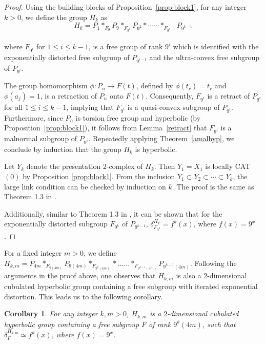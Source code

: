 \documentclass[oneside,11pt,reqno]{amsart}
\newtheorem{cor}[thm]{Corollary}
\theoremstyle{definition}
\begin{document}
\begin{proof}
Using the building blocks of Proposition~\ref{prop:block1}, for any integer $k>0$, we define the group $H_k$ as
$$H_k = P_1 \ast_{F_9} P_9 \ast_{F_{9^2}} P_{9^2} \ast \cdots \cdots \ast_{F_{9^{k-1}}} P_{9^{k-1}}$$\\
where $F_{9^i}$ for $1\leq i \leq k-1$, is a free group of rank $9^i$ which is identified with the exponentially distorted free subgroup of $P_{9^{i-1}}$ and the ultra-convex free subgroup of $P_{9^i}$.

The group homomorphism $\phi : P_n \rightarrow F(t)$, defined by $\phi(t_r)=t_r$ and $\phi(a_j)=1$, is a retraction of $P_n$ onto $F(t)$. Consequently, $F_{9^i}$ is a retract of $P_{9^i}$ for all $1 \leq i \leq k-1$,  implying that $F_{9^i}$ is a quasi-convex subgroup of $P_{9^i}$. Furthermore, since $P_n$ is torsion free group  and hyperbolic  (by Proposition~\ref{prop:block1}), it follows from Lemma~\ref{retract} that $F_{9^i}$ is a malnormal subgroup of $P_{9^i}$.  Repeatedly applying Theorem~\ref{amalhyp}, we conclude by induction that the group $H_k$ is hyperbolic.


Let $Y_k$ denote the presentation $2$-complex of $H_k$. Then $ Y_1 = X_1$ is locally CAT$(0)$  by Proposition \ref{prop:block1}.
From the inclusion $Y_1 \subset Y_2 \subset \cdots \subset Y_k$, the large link condition can be checked by induction on $k$.  The proof is the same as Theorem 1.3 in 
\cite{BBD}.

Additionally, similar to Theorem 1.3 in 
\cite{BBD}, it can be shown that for the exponentially distorted subgroup $F_{9^{k}}$ of $P_{9^{k-1}}$, $\delta^{H_k}_{F_{9^k}} = f^k(x)$, where $f(x)=9^x$.




\end{proof}

For a fixed integer $m > 0$, we define $H_{k,m} = P_{4m} \ast_{F_{9(4m)}} P_{9(4m)} \ast_{F_{9^2(4m)}} \ast \ldots \ldots \ast_{F_{9^{k-1}(4m)}} P_{9^{k-1}(4m)}$. Following the arguments in the proof above, one observes that $H_{k,m}$ is also a $2$-dimensional cubulated hyperbolic group containing a free subgroup with iterated exponential distortion. This leads us to the following corollary.

\begin{cor}\label{hkm}
For any integer $k,m > 0$, $H_{k,m}$ is a $2$-dimensional cubulated hyperbolic group containing a free subgroup $F$ of rank $9^k(4m)$, such that $\delta_F^{H_{k,m}} \simeq f^k(x)$, where $f(x)=9^x$.
\end{cor}
\end{document}
